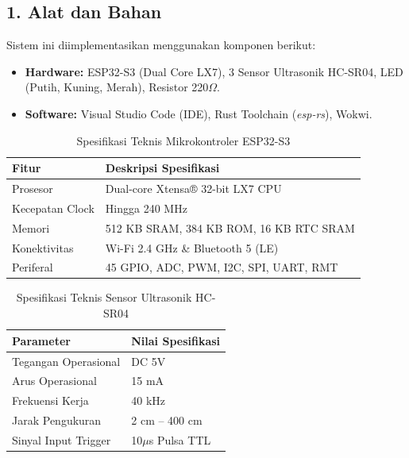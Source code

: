 \documentclass[12pt,a4paper]{article}
\begin{document}
\subsection*{1. Alat dan Bahan}
Sistem ini diimplementasikan menggunakan komponen berikut:
\begin{itemize}
    \item \textbf{Hardware:} ESP32-S3 (Dual Core LX7), 3 Sensor Ultrasonik HC-SR04, LED (Putih, Kuning, Merah), Resistor 220$\Omega$.
    \item \textbf{Software:} Visual Studio Code (IDE), Rust Toolchain (\textit{esp-rs}), Wokwi.
\end{itemize}

\begin{small}
\begin{table}[H]
\centering
\caption{Spesifikasi Teknis Mikrokontroler ESP32-S3}
\begin{tabular}{|l|l|}
\hline
\textbf{Fitur} & \textbf{Deskripsi Spesifikasi} \\ \hline
Prosesor & Dual-core Xtensa® 32-bit LX7 CPU \\ \hline
Kecepatan Clock & Hingga 240 MHz \\ \hline
Memori & 512 KB SRAM, 384 KB ROM, 16 KB RTC SRAM \\ \hline
Konektivitas & Wi-Fi 2.4 GHz \& Bluetooth 5 (LE) \\ \hline
Periferal & 45 GPIO, ADC, PWM, I2C, SPI, UART, RMT \\ \hline
\end{tabular}
\end{table}

\begin{table}[H]
\centering
\caption{Spesifikasi Teknis Sensor Ultrasonik HC-SR04}
\begin{tabular}{|l|l|}
\hline
\textbf{Parameter} & \textbf{Nilai Spesifikasi} \\ \hline
Tegangan Operasional & DC 5V \\ \hline
Arus Operasional & 15 mA \\ \hline
Frekuensi Kerja & 40 kHz \\ \hline
Jarak Pengukuran & 2 cm -- 400 cm \\ \hline
Sinyal Input Trigger & 10$\mu$s Pulsa TTL \\ \hline
\end{tabular}
\end{table}
\end{small}
\end{document}

